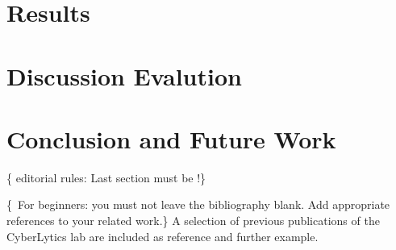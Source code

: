 \documentclass[conference,flushend]{iaria}
\begin{document}
\section{Results}
\lipsum[24]

\section{Discussion \textbar{} Evalution}
\lipsum[25]

\section{Conclusion and Future Work}
\{\faWarning{}  editorial rules: Last section must be !\}
\lipsum[26]

\{\,\faWarning{} For beginners: you must not leave the bibliography blank. Add appropriate references to your related work.\}
%
A selection of previous   publications of the CyberLytics lab
%
%
\cite{%
LeNe24goalHijackingLLMs,%
LeNe24vocattllm,%
PANP23seccloudfogai,%
StNe23foodfresh}
%
%
are included as reference and further example.

\begingroup
\sloppy
\printbibliography
\endgroup 
\end{document}
